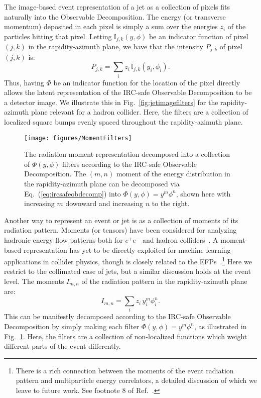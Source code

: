 \documentclass[letterpaper,11pt]{article}
\DeclareRobustCommand{\Fig}[1]{Fig.~\ref{#1}}
\DeclareRobustCommand{\Eq}[1]{Eq.~(\ref{#1})}
\DeclareRobustCommand{\Ref}[1]{Ref.~\cite{#1}}
\begin{document}
The image-based event representation of a jet as a collection of pixels fits naturally into the Observable Decomposition.
%
The energy (or transverse momentum) deposited in each pixel is simply a sum over the energies $z_i$ of the particles hitting that pixel.
%
Letting $\mathbb I_{j,k}(y,\phi)$ be an indicator function of pixel $(j,k)$ in the rapidity-azimuth plane, we have that the intensity $P_{j,k}$ of pixel $(j,k)$ is:
\begin{equation}\label{eq:img}
P_{j,k} = \sum_i z_i \, \mathbb I_{j,k}(y_i,\phi_i).
\end{equation}
%
Thus, having $\Phi$ be an indicator function for the location of the pixel directly allows the latent representation of the IRC-safe Observable Decomposition to be a detector image.
%
We illustrate this in \Fig{fig:jetimagefilters} for the rapidity-azimuth plane relevant for a hadron collider.
%
Here, the filters are a collection of localized square bumps evenly spaced throughout the rapidity-azimuth plane.


\begin{figure}[t]
\centering
\texttt{[image: figures/MomentFilters]}
\caption{\label{fig:momentfilters}
The radiation moment representation decomposed into a collection of $\Phi(y,\phi)$ filters according to the IRC-safe Observable Decomposition.
%
The $(m,n)$ moment of the energy distribution in the rapidity-azimuth plane can be decomposed via \Eq{eq:ircsafeobdecomp} into $\Phi(y,\phi)=y^m\phi^n$, shown here with increasing $m$ downward and increasing $n$ to the right.
}
\end{figure}


Another way to represent an event or jet is as a collection of moments of its radiation pattern.
%
Moments (or tensors) have been considered for analyzing hadronic energy flow patterns both for $e^+e^-$ and hadron colliders~\cite{Fox:1978vu,Donoghue:1979vi,GurAri:2011vx}.
%
A moment-based representation has yet to be directly exploited for machine learning applications in collider physics, though is closely related to the EFPs~\cite{Komiske:2017aww}.\footnote{There is a rich connection between the moments of the event radiation pattern and multiparticle energy correlators, a detailed discussion of which we leave to future work.  See footnote 8 of \Ref{Komiske:2017aww}.}
%
Here we restrict to the collimated case of jets, but a similar discussion holds at the event level.
%
The moments $I_{m,n}$ of the radiation pattern in the rapidity-azimuth plane are:
\begin{equation}\label{eq:moments}
I_{m,n} = \sum_i z_{i} \, y^m_i \phi^n_i.
\end{equation}
This can be manifestly decomposed according to the IRC-safe Observable Decomposition by simply making each filter $\Phi(y,\phi)=y^m\phi^n$, as illustrated in \Fig{fig:momentfilters}.
%
Here, the filters are a collection of non-localized functions which weight different parts of the event differently.
\end{document}

